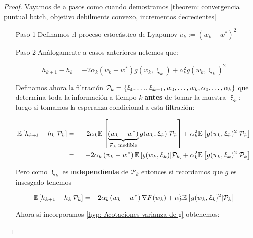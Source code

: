 \begin{proof}
	Vayamos de a pasos como cuando demostramos \ref{theorem: convergencia puntual batch, objetivo debilmente convexo, incrementos decrecientes}.
	
	\begin{enumerate}
		\item [Paso 1] Definamos el proceso estoc\'astico de Lyapunov $h_k := \left(w_k - w^*\right)^2$
		
		\item [Paso 2] An\'alogamente a casos anteriores notemos que:
		
		\begin{equation}
			h_{k+1} - h_k = -2 \alpha_k \left(w_k - w^*\right) g(w_k, \upxi_{k}) + \alpha_k^2 g(w_k, \upxi_{k})^2
		\end{equation}
		
		
		Definamos ahora la filtraci\'on $\mathcal{P}_k = \left\lbrace\upxi_{0}, \dots, \upxi_{k-1}, w_0, \dots, w_k, \alpha_0, \dots, \alpha_k\right\rbrace$ que determina toda la informaci\'on a tiempo $k$ \textbf{antes} de tomar la muestra $\upxi_{k}$; luego si tomamos la esperanza condicional a esta filtraci\'on:
		
		\begin{equation*}
		\begin{aligned}
			\mathbb{E} \left[{h_{k+1} - h_k } \vert \mathcal{P}_{k}\right] & = & -2 \alpha_k \mathbb{E} \left[{\underbrace{\left(w_k - w^*\right)}_{\mathcal{P}_k \text{ medible}} g(w_k, \upxi_{k}) } \vert \mathcal{P}_{k}\right] + \alpha_k^2 \mathbb{E} \left[{g(w_k, \upxi_{k})^2} \vert \mathcal{P}_{k}\right] \\
			& = & -2 \alpha_k \left(w_k - w^*\right) \mathbb{E} \left[{g(w_k, \upxi_{k})} \vert \mathcal{P}_{k}\right] + \alpha_k^2 \mathbb{E} \left[{g(w_k, \upxi_{k})^2} \vert \mathcal{P}_{k}\right] 
		\end{aligned}
		\end{equation*}
		
		Pero como $\upxi_{k}$ es \textbf{independiente } de $\mathcal{P}_k$ entonces si recordamos que $g$ es insesgado tenemos:
		
		\begin{equation*}
		\mathbb{E} \left[{h_{k+1} - h_k } \vert \mathcal{P}_{k}\right] = -2 \alpha_k \left(w_k - w^*\right) \nabla F(w_k) + \alpha_k^2 \mathbb{E} \left[{g(w_k, \upxi_{k})^2} \vert \mathcal{P}_{k}\right] 
		\end{equation*}		
		
		Ahora si incorporamos \ref{hyp: Acotaciones varianza de g} obtenemos:
		

\end{enumerate}
\end{proof}
